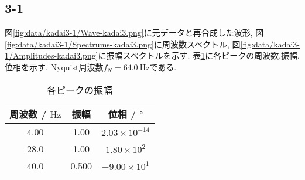 \subsection*{3-1}
図\ref{fig:data/kadai3-1/Wave-kadai3.png}に元データと再合成した波形,
図\ref{fig:data/kadai3-1/Spectrums-kadai3.png}に周波数スペクトル,
図\ref{fig:data/kadai3-1/Amplitudes-kadai3.png}に振幅スペクトルを示す.
表\ref{tab:3-1}に各ピークの周波数,振幅,位相を示す.
Nyquist周波数$f_{N}=64.0\ \si{\hertz}$である.
\begin{table}[h]
\caption{各ピークの振幅}
\label{tab:3-1}
\centering
\begin{tabular}{ccc}
\hline
周波数 / $\si{\hertz}$ & 振幅  & 位相 / $\si{\degree}$ \\
\hline \hline
4.00&1.00&$2.03\times10^{-14}$\\
28.0&1.00&$1.80\times10^2$\\
40.0&0.500&$-9.00\times10^1$\\
\hline
\end{tabular}
\end{table}